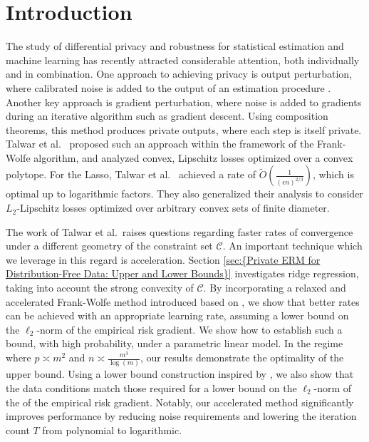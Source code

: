 \documentclass{article}
\begin{document}
\section{Introduction}\label{sec:Introduction}

The study of differential privacy and robustness for statistical estimation and machine learning has recently attracted considerable attention, both individually and in combination. One approach to achieving privacy is output perturbation, where calibrated noise is added to the output of an estimation procedure \cite{(NEAR), BOLT_ON_PRIV, EFF_PRIV_SMOOTH}. Another key approach is gradient perturbation, where noise is added to gradients during an iterative algorithm such as gradient descent. Using composition theorems, this method produces private outputs, where each step is itself private. Talwar et al.~\cite{NOPL} proposed such an approach within the framework of the Frank-Wolfe algorithm, and analyzed convex, Lipschitz losses optimized over a convex polytope. For the Lasso, Talwar et al.\
achieved a rate of $\widetilde{O}\left(\frac{1}{(\epsilon n)^{2/3}}\right)$, which is optimal up to logarithmic factors. They also generalized their analysis to consider $L_2$-Lipschitz losses optimized over arbitrary convex sets of finite diameter.

The work of Talwar et al.\ raises questions regarding faster rates of convergence under a different geometry of the constraint set $\mathcal{C}$. An important technique which we leverage in this regard is acceleration. Section \ref{sec:{Private ERM for Distribution-Free Data: Upper and Lower Bounds}}  investigates ridge regression, taking into account the strong convexity of $\mathcal{C}$. By incorporating a relaxed and accelerated Frank-Wolfe method introduced based on \cite{ACCFW}, we show that better rates can be achieved with an appropriate learning rate, assuming a lower bound on the $\ell_2$-norm of the empirical risk gradient. We show how to establish such a bound, with high probability, under a parametric linear model. In the regime where $p \asymp m^2$ and $n \asymp \frac{m^3}{\log(m)}$, our results demonstrate the optimality of the upper bound. Using a lower bound construction inspired by \cite{NOPL}, we also show that the data conditions match those required for a lower bound on the $\ell_2$-norm of the of the empirical risk gradient. Notably, our accelerated method significantly improves performance by reducing noise requirements and lowering the iteration count $T$ from polynomial to logarithmic.
\end{document}
